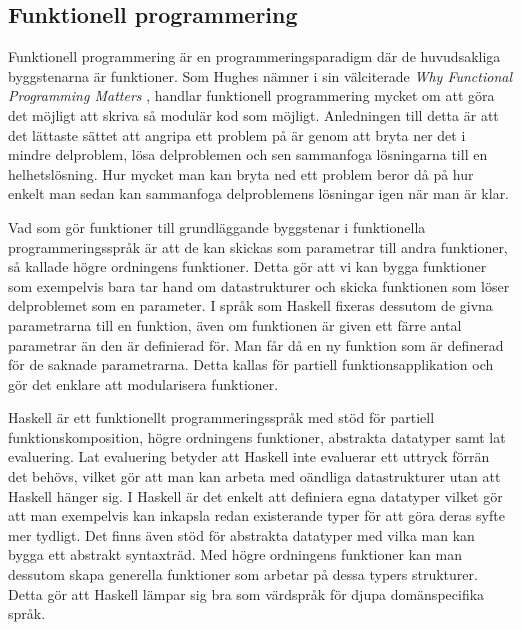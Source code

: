 \documentclass[]{article}
\begin{document}
\subsection{Funktionell programmering}
Funktionell programmering är en programmeringsparadigm där de huvudsakliga
byggstenarna är funktioner.
Som Hughes nämner i sin välciterade \textit{Why Functional Programming Matters}
\cite{hughes1989functional}, handlar funktionell programmering mycket om att göra det
möjligt att skriva så modulär kod som möjligt.
Anledningen till detta är att det lättaste sättet att angripa ett problem på är
genom att bryta ner det i mindre delproblem, lösa delproblemen och sen
sammanfoga lösningarna till en helhetslösning.
Hur mycket man kan bryta ned ett problem beror då på hur enkelt man sedan kan
sammanfoga delproblemens lösningar igen när man är klar.

Vad som gör funktioner till grundläggande byggstenar i funktionella
programmeringsspråk är att de kan skickas som parametrar till andra funktioner,
så kallade högre ordningens funktioner.
Detta gör att vi kan bygga funktioner som exempelvis bara tar hand om
datastrukturer och skicka funktionen som löser delproblemet som en parameter.
I språk som Haskell fixeras dessutom de givna parametrarna till en funktion,
även om funktionen är given ett färre antal parametrar än den är definierad för. Man får då en ny funktion som är definerad för de saknade parametrarna.
Detta kallas för partiell funktionsapplikation och gör det enklare att modularisera funktioner.

Haskell är ett funktionellt programmeringsspråk med stöd för partiell funktionskomposition,
högre ordningens funktioner, abstrakta datatyper samt lat evaluering.
Lat evaluering betyder att Haskell inte evaluerar ett uttryck förrän det behövs, vilket gör att man kan arbeta med oändliga datastrukturer utan att Haskell hänger sig.
I Haskell är det enkelt att definiera egna datatyper vilket gör att man exempelvis kan inkapsla redan existerande typer för att göra deras syfte mer tydligt. Det finns även stöd för abstrakta datatyper med vilka man kan bygga ett abstrakt syntaxträd. Med högre ordningens funktioner kan man dessutom skapa generella funktioner som arbetar på dessa typers strukturer. Detta gör att Haskell lämpar sig bra som värdspråk för djupa domänspecifika språk.
\end{document}
